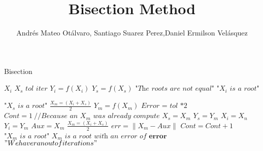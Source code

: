 \documentclass{article}
\title{Bisection Method}
\author{Andrés Mateo Otálvaro, Santiago Suarez Perez,Daniel Ermilson Velásquez}
\begin{document}
\maketitle
\begin{algorithm}
\caption{Bisection}\label{numerical methods}
\begin{algorithmic}[1]
\State $\textit{$X_i$}$\;
\State $\textit{$X_s$}$\;
\State $\textit{tol}$\;
\State $\textit{iter}$\;
\State $Y_i=f(X_i)$\;
\State$Y_s=f(X_s)$\;
		\State $\textit{"The roots are not equal"}$
		\State $\textit{"$X_i$ is a root"}$
	
		\State $\textit{"$X_s$ is a root"}$ 
	\Else
		\State $\frac{X_m=(X_i+X_s)}{2}$
		\State $Y_m=f(X_m)$
		\State $\textit{Error\ = tol *2}$ 
		\State $Cont=1\ \textit{//Because an $X_m$ was already compute}$
				\State $X_s=X_m$
				\State $Y_s=Y_m$
			\Else 
				\State $X_i=X_n$
				\State $Y_i=Y_m$
			\EndIf
				\State $Aux=X_m$
				\State $\frac{X_m=(X_i+X_s)}{2}$
				\State $err= \|X_m-Aux \| $
				\State $Cont=Cont+1$
		\EndWhile
			\State $\textit{"$X_m$ is a root"}$
			\State $\textit{$X_m$ is a root with an error of\ } \textbf{error}$ 
			\State $"We have ran out of iterations"$
		\EndIf
	\EndIf
\EndProcedure
\end{algorithmic}
\end{algorithm}
\end{document}
